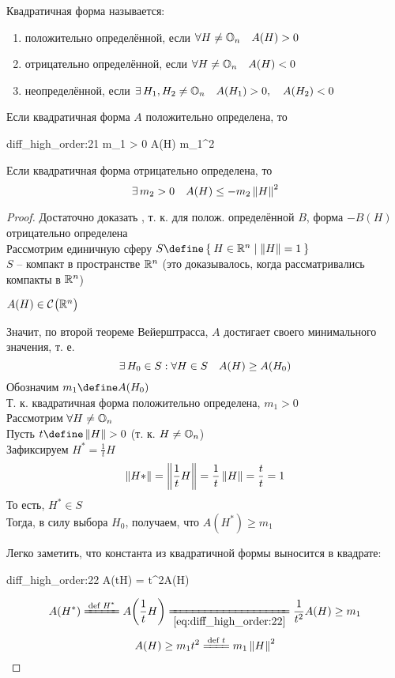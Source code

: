 \begin{remind}
	Квадратичная форма называется:
	\begin{enumerate}
		\item положительно определённой, если $ \forall H \ne \mathbb{O}_{n} \quad A(H) > 0 $
		\item отрицательно определённой, если $ \forall H \ne \mathbb{O}_{n} \quad A(H) < 0 $
		\item неопределённой, если $ \exists\, H_1, H_2 \ne \mathbb{O}_{n} \quad A(H_1) > 0, \quad A(H_2) < 0 $
	\end{enumerate}
\end{remind}

\begin{theorem}
	Если квадратичная форма $ A $ положительно определена, то
	\begin{equ}{diff_high_order:21}
		\exist m_1 > 0 \quad A(H) \ge m_1^2
	\end{equ}
	Если квадратичная форма отрицательно определена, то
	$$ \exists\, m_2 > 0 \quad A(H) \le -m_2\left\|{H}\right\|^2 $$
\end{theorem}

\begin{proof}
	Достаточно доказать , т. к. для полож. определённой $ B $, форма $ -B(H) $ отрицательно определена \\
	Рассмотрим единичную сферу $ S \define \set{H \in \R^n | \norm{H} = 1} $ \\
	$ S $ -- компакт в пространстве $ \mathbb{R}^n $ (это доказывалось, когда рассматривались компакты в $ \mathbb{R}^n $)
	\begin{intuition}
		$ A(H) \in \mathcal{C}^{} \big( {\mathbb{R}^n} \big)  $
	\end{intuition}
	Значит, по второй теореме Вейерштрасса, $ A $ достигает своего минимального значения, т. е.
	$$ \exists\, H_0 \in S : \forall H \in S \quad A(H) \ge A(H_0) $$
	Обозначим $ m_1 \define A(H_0) $ \\
	Т. к. квадратичная форма положительно определена, $ m_1 > 0 $ \\
	Рассмотрим $ \forall H \ne \mathbb{O}_{n} $ \\
	Пусть $ t \define \norm{H} > 0 $ (т. к. $ H \ne \mathbb{O}_{n} $) \\
	Зафиксируем $ H^* = \frac1t H $
	$$ \left\|{H*}\right\| = \left\|{\frac1tH}\right\| = \frac1t\left\|{H}\right\| = \frac{t}t = 1 $$
	То есть, $ H^* \in S $ \\
	Тогда, в силу выбора $ H_0 $, получаем, что $ A(H^*) \ge m_1 $
	\begin{remark}
		Легко заметить, что константа из квадратичной формы выносится в квадрате:
		\begin{equ}{diff_high_order:22}
			A(tH) = t^2A(H)
		\end{equ}
	\end{remark}
	$$ A(H^*) \bdefeq{H^*} A \bigg( \frac1tH \bigg) \undereq{\eref{diff_high_order:22}} \frac1{t^2}A(H) \ge m_1 $$
	$$ A(H) \ge m_1t^2 \bdefeq{t} m_1 \norm{H}^2 $$
\end{proof}

